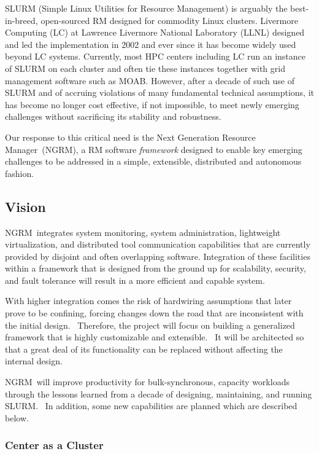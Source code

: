 \documentclass{article}
\newcommand{\ngrm}{NGRM}
\newcommand{\ngrmfull}{Next Generation Resource Manager}
\begin{document}
SLURM\cite{SlurmDesign} (Simple Linux Utilities for Resource Management) is arguably the
best-in-breed, open-sourced RM designed for commodity Linux clusters.
Livermore Computing (LC) at Lawrence Livermore National Laboratory (LLNL)
designed and led the implementation in 2002 and ever since it has become
widely used beyond LC systems. Currently, most HPC centers including LC
run an instance of SLURM on each cluster and often tie these instances
together with grid management software such as MOAB\cite{MOAB:online}.  However, after a
decade of such use of SLURM and of accruing violations of many fundamental
technical assumptions, it has become no longer cost effective, if not
impossible, to meet newly emerging challenges without sacrificing its
stability and robustness.

Our response to this critical need is the \ngrmfull\ (\ngrm ), a RM software
{\em framework} designed to enable key emerging challenges to be addressed
in a simple, extensible, distributed and autonomous fashion.

\subsection{Vision}
\ngrm\ integrates system monitoring, system administration, lightweight
virtualization, and distributed tool communication capabilities that are
currently provided by disjoint and often overlapping software.
Integration of these facilities within a framework that is designed from
the ground up for scalability, security, and fault tolerance will result
in a more efficient and capable system.

With higher integration comes the risk of hardwiring assumptions that
later prove to be confining, forcing changes down the road that are
inconsistent with the initial design.  Therefore, the project will focus
on building a generalized framework that is highly customizable and
extensible.  It will be architected so that a great deal of its
functionality can be replaced without affecting the internal design.

\ngrm\ will improve productivity for bulk-synchronous, capacity workloads
through the lessons learned from a decade of designing, maintaining,
and running SLURM.  In addition, some new capabilities are planned which
are described below.

\subsubsection{Center as a Cluster}
\end{document}
